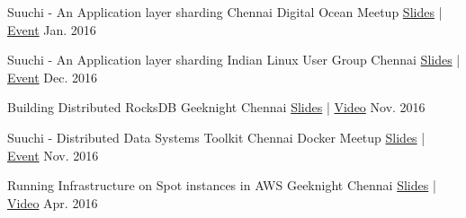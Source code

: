 



\begin{cvhonors}

  \cvhonor
    {Suuchi - An Application layer sharding} %
    {Chennai Digital Ocean Meetup} %
    {\href{https://speakerdeck.com/ashwanthkumar/suuchi-application-layer-sharding}{Slides} | \href{https://www.meetup.com/DigitalOceanChennai/events/236495174/}{Event}} %
    {Jan. 2016} %

  \cvhonor
    {Suuchi - An Application layer sharding} %
    {Indian Linux User Group Chennai} %
    {\href{https://speakerdeck.com/ashwanthkumar/suuchi-application-layer-sharding}{Slides} | \href{https://www.meetup.com/ILUG-C/events/233660958/}{Event}} %
    {Dec. 2016} %

  \cvhonor
    {Building Distributed RocksDB} %
    {Geeknight Chennai} %
    {\href{http://bit.ly/distributed-rocksdb}{Slides} | \href{https://www.youtube.com/watch?v=PSCa9_Avne0}{Video}} %
    {Nov. 2016} %

  \cvhonor
    {Suuchi - Distributed Data Systems Toolkit} %
    {Chennai Docker Meetup} %
    {\href{http://bit.ly/suuchi-toolkit}{Slides} | \href{https://www.meetup.com/docker-Chennai/events/235155974/}{Event}} %
    {Nov. 2016} %

  \cvhonor
    {Running Infrastructure on Spot instances in AWS} %
    {Geeknight Chennai} %
    {\href{http://j.mp/to-matsya-geeknight}{Slides} | \href{https://www.youtube.com/watch?v=qeBV9JRoTOA}{Video}} %
    {Apr. 2016} %

\end{cvhonors}


